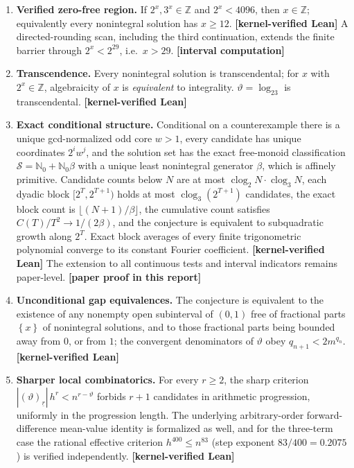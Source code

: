 \documentclass[11pt,oneside]{article}
\theoremstyle{definition}
\theoremstyle{remark}
\newcommand{\Nzero}{\mathbb N_0}
\newcommand{\Z}{\mathbb Z}
\newcommand{\thetaq}{\vartheta}
\newcommand{\Sol}{\mathcal S}
\newcommand{\fract}[1]{\left\{#1\right\}}
\newcommand{\fall}[2]{\left(#1\right)_{\!\underline{#2}}}
\newcommand{\clog}{\operatorname{clog}}
\newcommand{\statuslean}{\textcolor{leanblue}{\textbf{[kernel-verified Lean]}}}
\newcommand{\statusnew}{\textcolor{newgreen}{\textbf{[paper proof in this report]}}}
\newcommand{\statuscomp}{\textcolor{computeviolet}{\textbf{[interval computation]}}}
\begin{document}
\begin{enumerate}
\item \textbf{Verified zero-free region.}  If $2^x,3^x\in\Z$ and $2^x<4096$, then $x\in\Z$;
equivalently every nonintegral solution has $x\ge12$.  \statuslean{}  A directed-rounding
scan, including the third continuation, extends the finite barrier through $2^x<2^{29}$, i.e.\ $x>29$.  \statuscomp

\item \textbf{Transcendence.}  Every nonintegral solution is transcendental; for $x$ with
$2^x\in\Z$, algebraicity of $x$ is \emph{equivalent} to integrality.  $\thetaq=\log_23$ is
transcendental.  \statuslean

\item \textbf{Exact conditional structure.}  Conditional on a counterexample there is a unique
gcd-normalized odd core $w>1$, every candidate has unique coordinates $2^iw^j$, and the
solution set has the exact free-monoid classification $\Sol=\Nzero+\Nzero\beta$ with a unique
least nonintegral generator $\beta$, which is affinely primitive.  Candidate counts below $N$
are at most $\clog_2N\cdot\clog_3N$, each dyadic block $[2^T,2^{T+1})$ holds at most
$\clog_3(2^{T+1})$ candidates, the exact block count is $\lfloor(N+1)/\beta\rfloor$, the
cumulative count satisfies $C(T)/T^2\to1/(2\beta)$, and the conjecture is equivalent to
subquadratic growth along $2^T$.  Exact block averages of every finite trigonometric
polynomial converge to its constant Fourier coefficient.  \statuslean{}  The extension to all
continuous tests and interval indicators remains paper-level.  \statusnew

\item \textbf{Unconditional gap equivalences.}  The conjecture is equivalent to the existence
of any nonempty open subinterval of $(0,1)$ free of fractional parts $\fract{x}$ of
nonintegral solutions, and to those fractional parts being bounded away from $0$, or from
$1$; the convergent denominators of $\thetaq$ obey $q_{n+1}<2m^{q_n}$.  \statuslean

\item \textbf{Sharper local combinatorics.}  For every $r\ge2$, the sharp criterion
$|\fall{\thetaq}{r}|\,h^r<n^{r-\thetaq}$ forbids $r+1$ candidates in arithmetic progression,
uniformly in the progression length.  The underlying arbitrary-order forward-difference
mean-value identity is formalized as well, and for the three-term case the rational effective
criterion $h^{400}\le n^{83}$ (step exponent $83/400=0.2075$) is verified independently.
\statuslean


\end{enumerate}
\end{document}
